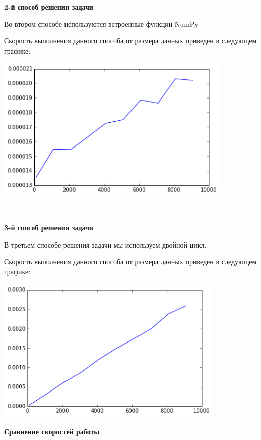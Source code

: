\documentclass[12pt, a4paper]{article}
\begin{document}
			{\bf 2-й способ решения задачи\\}

				Во втором способе используются встроенные функции NumPy

				Скорость выполнения данного способа от размера данных приведен в следующем графике:
				\begin{center}
					\includegraphics[height=7cm]{timeit/num4_ti2.png}
				\end{center}
				~\newline


			{\bf 3-й способ решения задачи\\}

				В третьем способе решения задачи мы используем двойной цикл.

				Скорость выполнения данного способа от размера данных приведен в следующем графике:
				\begin{center}
					\includegraphics[height=7cm]{timeit/num4_ti3.png}
				\end{center}


			{\bf Сравнение скоростей работы\\}
\end{document}

